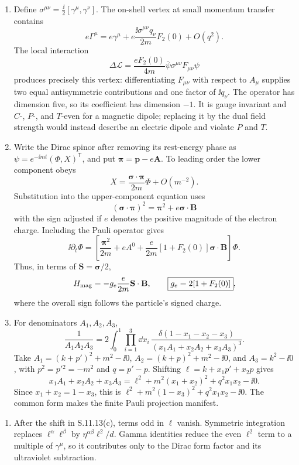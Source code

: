 \begin{enumerate}
\begin{enumerate}
\item
Define
\(\sigma^{\mu\nu}=\tfrac{\ii}{2}[\gamma^\mu,\gamma^\nu]\).  The on-shell
vertex at small momentum transfer contains
\[
 e\Gamma^\mu=e\gamma^\mu
 +e\frac{\ii\sigma^{\mu\nu}q_\nu}{2m}F_2(0)+O(q^2).
\]
The local interaction
\[
 \boxed{\;
 \Delta\mathcal L
 =\frac{eF_2(0)}{4m}
 \bar\psi\sigma^{\mu\nu}F_{\mu\nu}\psi
 \;}
\]
produces precisely this vertex: differentiating \(F_{\mu\nu}\) with
respect to \(A_\mu\) supplies two equal antisymmetric contributions and one
factor of \(\ii q_\nu\).  The operator has dimension five, so its coefficient
has dimension \(-1\).  It is gauge invariant and \(C\)-, \(P\)-, and
\(T\)-even for a magnetic dipole; replacing it by the dual field strength
would instead describe an electric dipole and violate \(P\) and \(T\).
\item
Write the Dirac spinor after removing its rest-energy phase as
\(\psi=e^{-\ii mt}(\Phi,X)^{\mathsf T}\), and put
\(\boldsymbol\pi=\mathbf p-e\mathbf A\).  To leading order the lower
component obeys
\[
 X=\frac{\boldsymbol\sigma\cdot\boldsymbol\pi}{2m}\Phi+O(m^{-2}).
\]
Substitution into the upper-component equation uses
\[
 (\boldsymbol\sigma\cdot\boldsymbol\pi)^2
 =\boldsymbol\pi^2+e\boldsymbol\sigma\cdot\mathbf B
\]
with the sign adjusted if \(e\) denotes the positive magnitude of the
electron charge.  Including the Pauli operator gives
\[
 \ii\partial_t\Phi=
 \left[
 \frac{\boldsymbol\pi^2}{2m}+eA^0
 +\frac{e}{2m}[1+F_2(0)]
 \boldsymbol\sigma\cdot\mathbf B
 \right]\Phi.
\]
Thus, in terms of \(\mathbf S=\boldsymbol\sigma/2\),
\[
 H_{\rm mag}=-g_e\frac{e}{2m}\mathbf S\cdot\mathbf B,\qquad
 \boxed{g_e=2[1+F_2(0)]},
\]
where the overall sign follows the particle's signed charge.
\item
For denominators \(A_1,A_2,A_3\),
\[
 \frac1{A_1A_2A_3}
 =2\int_0^1\prod_{i=1}^3\dd x_i\,
 \frac{\delta(1-x_1-x_2-x_3)}
 {(x_1A_1+x_2A_2+x_3A_3)^3}.
\]
Take \(A_1=(k+p')^2+m^2-\ii0\),
\(A_2=(k+p)^2+m^2-\ii0\), and \(A_3=k^2-\ii0\), with
\(p^2=p'{}^2=-m^2\) and \(q=p'-p\).  Shifting
\(\ell=k+x_1p'+x_2p\) gives
\[
 \boxed{\;
 x_1A_1+x_2A_2+x_3A_3
 =\ell^2+m^2(x_1+x_2)^2+q^2x_1x_2-\ii0.
 \;}
\]
Since \(x_1+x_2=1-x_3\), this is
\(\ell^2+m^2(1-x_3)^2+q^2x_1x_2-\ii0\).  The common form makes the finite
Pauli projection manifest.
\end{enumerate}

\begin{enumerate}
\item
After the shift in S.11.13(c), terms odd in \(\ell\) vanish.  Symmetric
integration replaces
\(\ell^\alpha\ell^\beta\) by
\(\eta^{\alpha\beta}\ell^2/d\).  Gamma identities reduce the even
\(\ell^2\) term to a multiple of \(\gamma^\mu\), so it contributes only to
the Dirac form factor and its ultraviolet subtraction.


\end{enumerate}
\end{enumerate}
